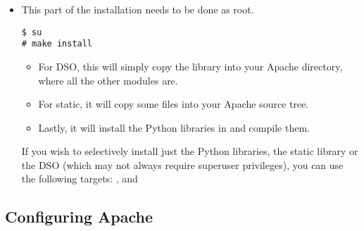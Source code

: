 \begin{itemize}

\item
This part of the installation needs to be done as root. 
\begin{verbatim}
$ su
# make install
\end{verbatim}
                      
\begin{itemize}

\item
For DSO, this will simply copy the library into your Apache 
directory, where all the other modules are.

\item
For static, it will copy some files into your Apache source tree.

\item
Lastly, it will install the Python libraries in  and
compile them. 

\end{itemize} 

 If you wish to selectively install just the Python libraries,
the static library or the DSO (which may not always require superuser
privileges), you can use the following  targets:
,
 and 

\end{itemize}

\subsection{Configuring Apache\label{inst-apacheconfig}}

